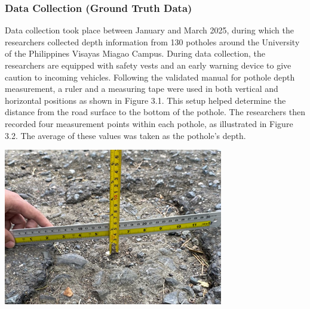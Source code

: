 \subsubsection{Data Collection (Ground Truth Data)}
Data collection took place between January and March 2025, during which the researchers collected depth information from 130 potholes around the University of the Philippines Visayas Miagao Campus. During data collection, the researchers are equipped with safety vests and an early warning device to give caution to incoming vehicles. Following the validated manual for pothole depth measurement, a ruler and a measuring tape were used in both vertical and horizontal positions as shown in Figure 3.1. This setup helped determine the distance from the road surface to the bottom of the pothole. The researchers then recorded four measurement points within each pothole, as illustrated in Figure 3.2. The average of these values was taken as the pothole’s depth.

\begin{center}
	\includegraphics[scale=0.85]{measure.png}
\end{center}

